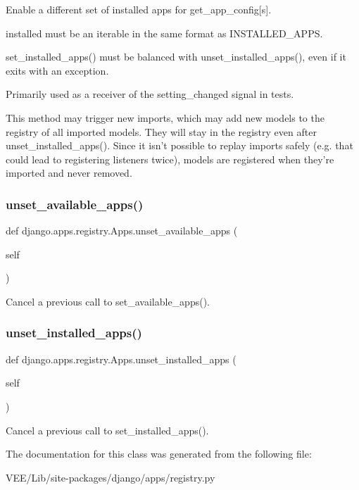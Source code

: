\begin{DoxyVerb}Enable a different set of installed apps for get_app_config[s].

installed must be an iterable in the same format as INSTALLED_APPS.

set_installed_apps() must be balanced with unset_installed_apps(),
even if it exits with an exception.

Primarily used as a receiver of the setting_changed signal in tests.

This method may trigger new imports, which may add new models to the
registry of all imported models. They will stay in the registry even
after unset_installed_apps(). Since it isn't possible to replay
imports safely (e.g. that could lead to registering listeners twice),
models are registered when they're imported and never removed.
\end{DoxyVerb}
 \mbox{\label{classdjango_1_1apps_1_1registry_1_1_apps_a7c128e2c2e7d2424daea3add910d8113}} 
\subsubsection{\texorpdfstring{unset\+\_\+available\+\_\+apps()}{unset\_available\_apps()}}
{\footnotesize\ttfamily def django.\+apps.\+registry.\+Apps.\+unset\+\_\+available\+\_\+apps (\begin{DoxyParamCaption}\item[{}]{self }\end{DoxyParamCaption})}

\begin{DoxyVerb}Cancel a previous call to set_available_apps().\end{DoxyVerb}
 \mbox{\label{classdjango_1_1apps_1_1registry_1_1_apps_af7409dd22d1f192cb2d743622ef08ff7}} 
\subsubsection{\texorpdfstring{unset\+\_\+installed\+\_\+apps()}{unset\_installed\_apps()}}
{\footnotesize\ttfamily def django.\+apps.\+registry.\+Apps.\+unset\+\_\+installed\+\_\+apps (\begin{DoxyParamCaption}\item[{}]{self }\end{DoxyParamCaption})}

\begin{DoxyVerb}Cancel a previous call to set_installed_apps().\end{DoxyVerb}
 

The documentation for this class was generated from the following file\+:\begin{DoxyCompactItemize}
\item 
V\+E\+E/\+Lib/site-\/packages/django/apps/registry.\+py\end{DoxyCompactItemize}
